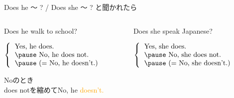 \documentclass[aspectratio=169]{beamer}
\newcommand{\myaudio}[1]{\href{#1}{\faVolumeUp}}
\begin{document}
\begin{frame}[plain]{Does he  〜 ? / Does she 〜 ? と聞かれたら}
 \Large


\begin{columns}[t]
\begin{column}{.475\textwidth}
Does he walk to school?

\vspace{20pt}

\pause

\mbox{}\hspace{40pt}$\left\{\begin{tabular}{l}
         \text{Yes, he does.}\\\pause
         \text{No, he does not.}\\\pause
         \text{(}= \text{No, he doesn't.)}\\
       \end{tabular}\right.$

\pause

\vspace{10pt}

{\small Noのとき\\[-5pt]does notを縮めてNo, he \textcolor{orange}{doesn't.}}

\end{column}
\pause
\begin{column}{.475\textwidth}
Does she speak Japanese?

\vspace{20pt}

\pause

\mbox{}\hspace{40pt}$\left\{\begin{tabular}{l}
         \text{Yes, she does.}\\\pause
         \text{No, she does not.}\\\pause
           \text{(}= \text{No, she doesn't.)}
       \end{tabular}\right.$


\pause

\vspace{20pt}
\mbox{}\hfill\myaudio{./audio/011_answer_do_02.mp3}\,\,{}

\end{column}
\end{columns}

\end{frame}
\end{document}
